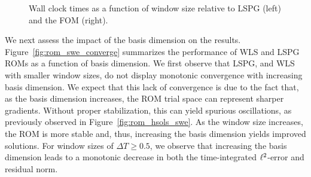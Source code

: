\begin{figure}
\begin{center}
\begin{subfigure}[t]{0.49\textwidth}
\end{subfigure}
\caption{Wall clock times as a function of window size relative to LSPG (left) and the FOM (right).} 
\label{fig:rom_swe_timings}
\end{center}
\end{figure}

We next assess the impact of the basis dimension on the results. Figure~\ref{fig:rom_swe_converge} summarizes the performance of WLS and LSPG ROMs as a function of basis dimension. We first observe that LSPG, and WLS with smaller window sizes, do not display monotonic convergence with increasing basis dimension. 
We expect that this lack of convergence is due to the fact that, as the basis dimension increases, the ROM trial space can represent sharper gradients. Without proper stabilization, this can yield spurious oscillations, as previously observed in Figure~\ref{fig:rom_hsols_swe}. As the window size increases, the ROM is more stable and, thus, increasing the basis dimension yields improved solutions. 
For window sizes of $\Delta T \ge 0.5$, we observe that increasing the basis dimension leads to a monotonic decrease in both the time-integrated $\ell^2$-error and residual norm. 

